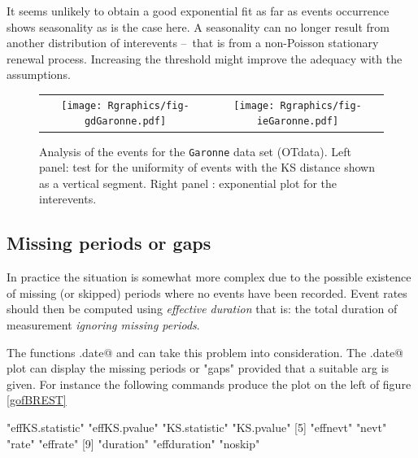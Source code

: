 \documentclass[a4paper]{report}
\begin{document}
\noindent
It seems unlikely to obtain a good exponential fit
as far as events occurrence shows seasonality as is the case here.
A seasonality can no longer result from another distribution of 
interevents --~that is from a non-Poisson stationary renewal process.
Increasing the threshold might improve the adequacy with the 
assumptions.

\begin{figure}
  \centering
  \begin{tabular}{c c} 
    \texttt{[image: Rgraphics/fig-gdGaronne.pdf]} &
    \texttt{[image: Rgraphics/fig-ieGaronne.pdf]} 
  \end{tabular}
  \caption{\label{KSEVT} Analysis of the events for the
    \texttt{Garonne} data set (OTdata).  Left panel: test for the
    uniformity of events with the KS distance shown as a
    vertical segment.  Right panel : exponential plot for the
    interevents.}
\end{figure}

\subsection{Missing periods or gaps}
% 
In practice the situation is somewhat more
complex due to the possible existence of missing (or skipped) periods
where no events have been recorded.  Event rates should then be
computed using \textit{effective duration} 
%
that is: the total duration of measurement \textit{ignoring missing
  periods}.

The functions \verb@gof.date@ and \verb@interevt@ can take this
problem into consideration. The \verb@gof.date@ plot can display the
missing periods or "gaps" provided that a suitable \verb@skip@ arg is
given. For instance the following commands produce the plot on the
left of figure \ref{gofBREST}

\begin{Schunk}
\begin{Soutput}
 [1] "effKS.statistic" "effKS.pvalue"    "KS.statistic"    "KS.pvalue"      
 [5] "effnevt"         "nevt"            "rate"            "effrate"        
 [9] "duration"        "effduration"     "noskip"         
\end{Soutput}
\end{Schunk}
\end{document}
